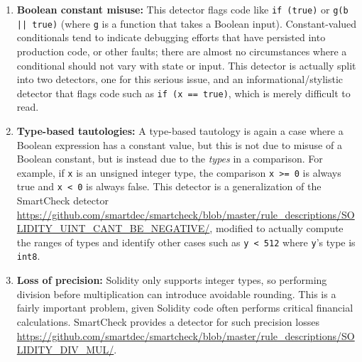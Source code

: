 \begin{enumerate}
\item {\bf Boolean constant misuse:}  This detector flags code like {\tt if (true)} or {\tt g(b || true)} (where {\tt g} is a function that takes a Boolean input).  Constant-valued conditionals tend to indicate debugging efforts that have persisted into production code, or other faults; there are almost no circumstances where a conditional should not vary with state or input.  This detector is actually split into two detectors, one for this serious issue, and an informational/stylistic detector that flags code such as {\tt if (x == true)}, which is merely difficult to read.

\item {\bf Type-based tautologies:}  A type-based tautology is again a case where a Boolean expression has a constant value, but this is not due to misuse of a Boolean constant, but is instead due to the \emph{types} in a comparison.  For example, if {\tt x} is an unsigned integer type, the comparison {\tt x >= 0} is always true and {\tt x < 0} is always false.  This detector is a generalization of the SmartCheck detector \url{https://github.com/smartdec/smartcheck/blob/master/rule\_descriptions/SOLIDITY\_UINT\_CANT\_BE\_NEGATIVE/}, modified to actually compute the ranges of types and identify other cases such as {\tt y < 512} where {\tt y}'s type is {\tt int8}.

\item {\bf Loss of precision:}  Solidity only supports integer types, so performing division before multiplication can introduce avoidable rounding.  This is a fairly important problem, given Solidity code often performs critical financial calculations.  SmartCheck provides a detector for such precision losses \url{https://github.com/smartdec/smartcheck/blob/master/rule\_descriptions/SOLIDITY\_DIV\_MUL/}.
\end{enumerate}      

